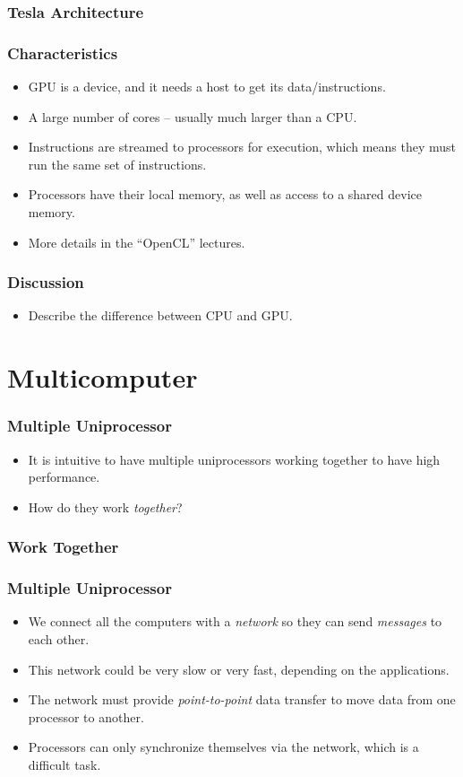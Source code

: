 \documentclass{beamer}
\begin{document}
\begin{CJK}{UTF8}{bsmi}
\begin{frame}
\frametitle{Tesla Architecture}
\centerline{}
\end{frame}

\begin{frame}
\frametitle{Characteristics}
\begin{itemize}
\item GPU is a device, and it needs a host to get its
  data/instructions.
\item A large number of cores -- usually much larger than a CPU.
\item Instructions are streamed to processors for execution, which
  means they must run the same set of instructions.
\item Processors have their local memory, as well as access to a
  shared device memory.
\item More details in the ``OpenCL'' lectures.
\end{itemize}
\end{frame}


\begin{frame}
\frametitle{Discussion}
\begin{itemize}
\item Describe the difference between CPU and GPU.
\end{itemize}
\end{frame}


\section{Multicomputer}

\begin{frame}
\frametitle{Multiple Uniprocessor}
\begin{itemize}
\item It is intuitive to have multiple uniprocessors working together
  to have high performance.
\item How do they work {\em together}?
\end{itemize}
\end{frame}


\begin{frame}
\frametitle{Work Together}
\centerline{}
\end{frame}


\begin{frame}
\frametitle{Multiple Uniprocessor}
\begin{itemize}
\item We connect all the computers with a {\em network} so they can
  send {\em messages} to each other.
\item This network could be very slow or very fast, depending on the
  applications.
\item The network must provide {\em point-to-point} data transfer to
  move data from one processor to another.
\item Processors can only synchronize themselves via the network, which
  is a difficult task.
\end{itemize}
\end{frame}


\end{CJK}
\end{document}
